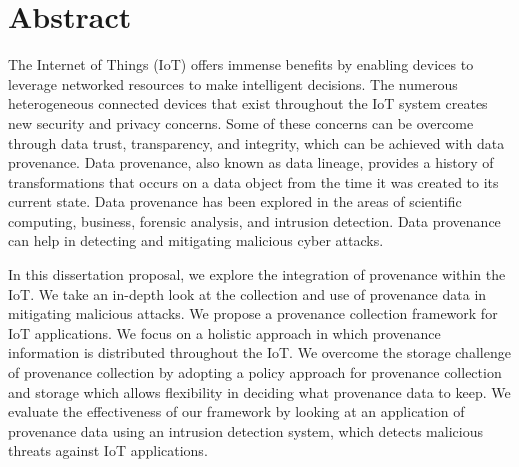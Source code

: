 

\chapter*{Abstract}
The Internet of Things (IoT) offers immense benefits by
enabling devices to leverage networked resources to make intelligent
decisions. The numerous heterogeneous connected devices that exist throughout
the IoT system creates new security and privacy concerns. Some of these concerns can
be overcome through data trust, transparency, and integrity, which can be
achieved with data provenance. Data provenance, also known as data lineage, provides a history of transformations that occurs on a data object from the time it was created to its current state. Data provenance has been explored in the areas of scientific computing,  business, forensic analysis, and intrusion detection. Data provenance can help in detecting and mitigating malicious cyber attacks.  \par In this dissertation proposal, we explore the integration of provenance within the IoT. We take an in-depth look at the collection and use of provenance data in mitigating malicious attacks. We propose a provenance collection framework for IoT applications. We focus on a holistic approach in which provenance information is distributed throughout the IoT. We overcome the storage challenge of provenance collection by adopting a policy approach for provenance collection and storage which allows flexibility in deciding what provenance data to keep. We evaluate the effectiveness of our framework by looking at an application of provenance data using an intrusion detection system, which detects malicious threats against IoT applications.


